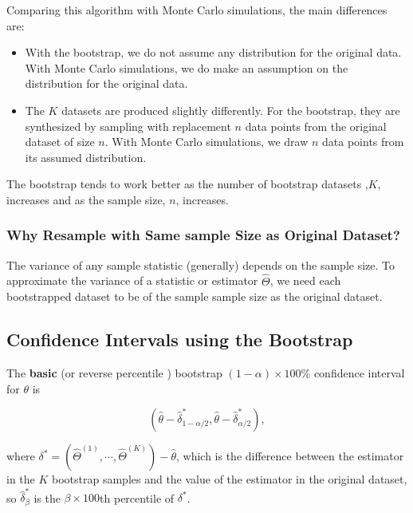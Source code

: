 \documentclass[
]{book}
\theoremstyle{definition}
\theoremstyle{definition}
\theoremstyle{definition}
\theoremstyle{definition}
\theoremstyle{remark}
\begin{document}
Comparing this algorithm with Monte Carlo simulations, the main differences are:

\begin{itemize}
\item
  With the bootstrap, we do not assume any distribution for the original data. With Monte Carlo simulations, we do make an assumption on the distribution for the original data.
\item
  The \(K\) datasets are produced slightly differently. For the bootstrap, they are synthesized by sampling with replacement \(n\) data points from the original dataset of size \(n\). With Monte Carlo simulations, we draw \(n\) data points from its assumed distribution.
\end{itemize}

The bootstrap tends to work better as the number of bootstrap datasets ,\(K\), increases and as the sample size, \(n\), increases.

\hypertarget{why-resample-with-same-sample-size-as-original-dataset}{%
\subsubsection{Why Resample with Same sample Size as Original Dataset?}\label{why-resample-with-same-sample-size-as-original-dataset}}

The variance of any sample statistic (generally) depends on the sample size. To approximate the variance of a statistic or estimator \(\hat{\Theta}\), we need each bootstrapped dataset to be of the sample sample size as the original dataset.

\hypertarget{confidence-intervals-using-the-bootstrap}{%
\subsection{Confidence Intervals using the Bootstrap}\label{confidence-intervals-using-the-bootstrap}}

The \textbf{basic} (or reverse percentile ) bootstrap \((1-\alpha) \times 100\%\) confidence interval for \(\theta\) is

\begin{equation} 
\left( \hat{\theta} - \hat{\delta}_{1-\alpha/2}^*, \hat{\theta} - \hat{\delta}_{\alpha/2}^* \right), 
\label{eq:8-CIboot}
\end{equation}

where \(\delta^* = (\hat{\Theta}^{(1)}, \cdots, \hat{\Theta}^{(K)}) - \hat{\theta}\), which is the difference between the estimator in the \(K\) bootstrap samples and the value of the estimator in the original dataset, so \(\hat{\delta}_{\beta}^*\) is the \(\beta \times 100\)th percentile of \(\delta^*\).
\end{document}
